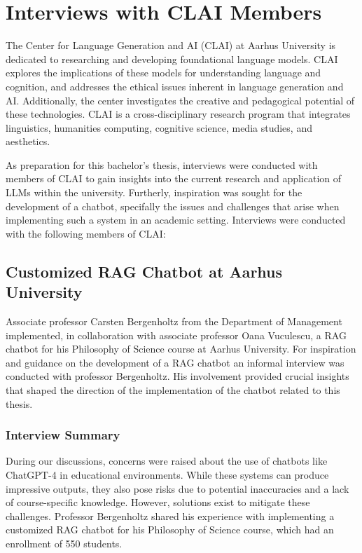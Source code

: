 \chapter{Interviews with CLAI Members}\label{appendix:Bergenholtz}
The Center for Language Generation and AI (CLAI) at Aarhus University is dedicated to researching and developing foundational language models. CLAI explores the implications of these models for understanding language and cognition, and addresses the ethical issues inherent in language generation and AI. Additionally, the center investigates the creative and pedagogical potential of these technologies. CLAI is a cross-disciplinary research program that integrates linguistics, humanities computing, cognitive science, media studies, and aesthetics.

As preparation for this bachelor's thesis, interviews were conducted with members of CLAI to gain insights into the current research and application of LLMs within the university. Furtherly, inspiration was sought for the development of a chatbot, specifally the issues and challenges that arise when implementing such a system in an academic setting.
Interviews were conducted with the following members of CLAI:

\section*{Customized RAG Chatbot at Aarhus University}
    Associate professor Carsten Bergenholtz from the Department of Management implemented, in collaboration with associate professor Oana Vuculescu, a RAG chatbot for his Philosophy of Science course at Aarhus University. For inspiration and guidance on the development of a RAG chatbot an informal interview was conducted with professor Bergenholtz. His involvement provided crucial insights that shaped the direction of the implementation of the chatbot related to this thesis.

    \subsection*{Interview Summary}

    During our discussions, concerns were raised about the use of chatbots like ChatGPT-4 in educational environments. While these systems can produce impressive outputs, they also pose risks due to potential inaccuracies and a lack of course-specific knowledge. However, solutions exist to mitigate these challenges. Professor Bergenholtz shared his experience with implementing a customized RAG chatbot for his Philosophy of Science course, which had an enrollment of 550 students.

